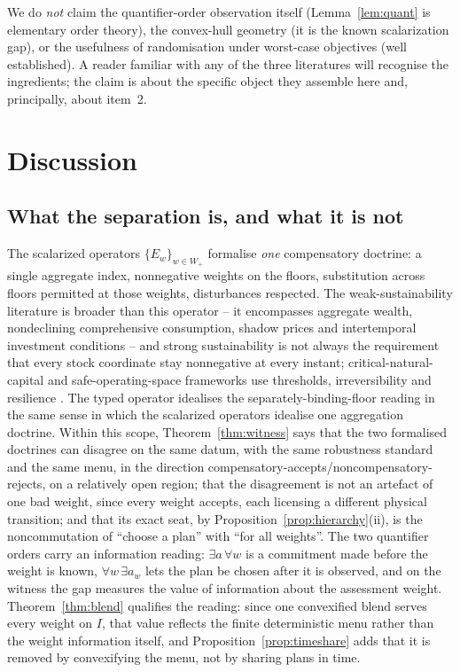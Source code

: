 \documentclass[preprint,11pt,authoryear]{elsarticle}
\theoremstyle{definition}
\theoremstyle{remark}
\newcommand{\Wp}{W_+}
\begin{document}
We do \emph{not} claim the quantifier-order observation itself (Lemma~\ref{lem:quant} is elementary order theory), the convex-hull geometry (it is the known scalarization gap), or the usefulness of randomisation under worst-case objectives (well established). A reader familiar with any of the three literatures will recognise the ingredients; the claim is about the specific object they assemble here and, principally, about item~2.

\section{Discussion}\label{sec:discussion}

\subsection{What the separation is, and what it is not}\label{sec:scope}

The scalarized operators $\{E_w\}_{w\in\Wp}$ formalise \emph{one} compensatory doctrine: a single aggregate index, nonnegative weights on the floors, substitution across floors permitted at those weights, disturbances respected. The weak-sustainability literature is broader than this operator -- it encompasses aggregate wealth, nondeclining comprehensive consumption, shadow prices and intertemporal investment conditions \citep{Solow1974,Asheim1994,DasguptaMaler2000,Neumayer2013} -- and strong sustainability is not always the requirement that every stock coordinate stay nonnegative at every instant; critical-natural-capital and safe-operating-space frameworks use thresholds, irreversibility and resilience \citep{Ekins2003,Rockstrom2009,Raworth2012,DoyenGajardo2020}. The typed operator idealises the separately-binding-floor reading in the same sense in which the scalarized operators idealise one aggregation doctrine. Within this scope, Theorem~\ref{thm:witness} says that the two formalised doctrines can disagree on the same datum, with the same robustness standard and the same menu, in the direction compensatory-accepts/noncompensatory-rejects, on a relatively open region; that the disagreement is not an artefact of one bad weight, since every weight accepts, each licensing a different physical transition; and that its exact seat, by Proposition~\ref{prop:hierarchy}(ii), is the noncommutation of ``choose a plan'' with ``for all weights''. The two quantifier orders carry an information reading: $\exists a\,\forall w$ is a commitment made before the weight is known, $\forall w\,\exists a_w$ lets the plan be chosen after it is observed, and on the witness the gap measures the value of information about the assessment weight. Theorem~\ref{thm:blend} qualifies the reading: since one convexified blend serves every weight on $I$, that value reflects the finite deterministic menu rather than the weight information itself, and Proposition~\ref{prop:timeshare} adds that it is removed by convexifying the menu, not by sharing plans in time.
\end{document}
